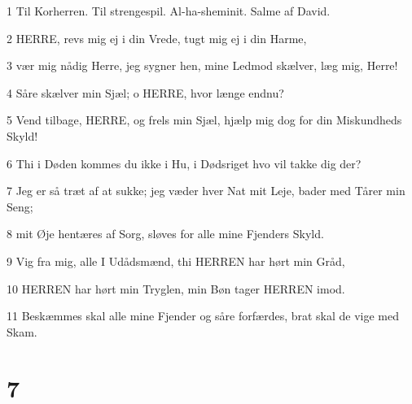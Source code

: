 \par 1 Til Korherren. Til strengespil. Al-ha-sheminit. Salme af David.
\par 2 HERRE, revs mig ej i din Vrede, tugt mig ej i din Harme,
\par 3 vær mig nådig Herre, jeg sygner hen, mine Ledmod skælver, læg mig, Herre!
\par 4 Såre skælver min Sjæl; o HERRE, hvor længe endnu?
\par 5 Vend tilbage, HERRE, og frels min Sjæl, hjælp mig dog for din Miskundheds Skyld!
\par 6 Thi i Døden kommes du ikke i Hu, i Dødsriget hvo vil takke dig der?
\par 7 Jeg er så træt af at sukke; jeg væder hver Nat mit Leje, bader med Tårer min Seng;
\par 8 mit Øje hentæres af Sorg, sløves for alle mine Fjenders Skyld.
\par 9 Vig fra mig, alle I Udådsmænd, thi HERREN har hørt min Gråd,
\par 10 HERREN har hørt min Tryglen, min Bøn tager HERREN imod.
\par 11 Beskæmmes skal alle mine Fjender og såre forfærdes, brat skal de vige med Skam.

\chapter{7}

